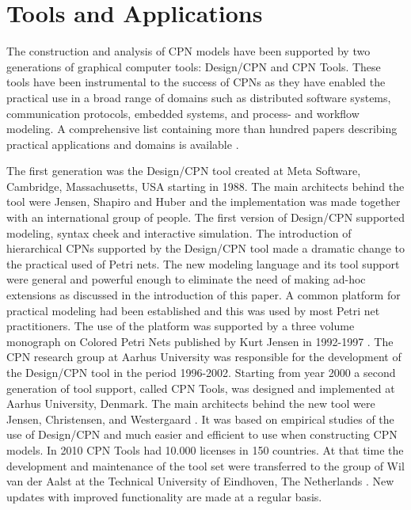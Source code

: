 \section{Tools and Applications}

The construction and analysis of CPN models have been supported by two
generations of graphical computer tools: Design/CPN and CPN
Tools. These tools have been instrumental to the success of CPNs as
they have enabled the practical use in a broad range of domains such
as distributed software systems, communication protocols, embedded
systems, and process- and workflow modeling. A comprehensive list
containing more than hundred papers describing practical applications
and domains is available \cite{cpnuse}.

The first generation was the Design/CPN tool \cite{X} created at Meta
Software, Cambridge, Massachusetts, USA starting in 1988. The main
architects behind the tool were Jensen, Shapiro and Huber
\cite{jensen:cpnmanual} and the implementation was made together with
an international group of people. The first version of Design/CPN
supported modeling, syntax cheek and interactive simulation. The
introduction of hierarchical CPNs supported by the Design/CPN tool
made a dramatic change to the practical used of Petri nets. The new
modeling language and its tool support were general and powerful
enough to eliminate the need of making ad-hoc extensions as discussed
in the introduction of this paper. A common platform for practical
modeling had been established and this was used by most Petri net
practitioners. The use of the platform was supported by a three volume
monograph on Colored Petri Nets published by Kurt Jensen in 1992-1997
\cite{jensen:cpnvols}. The CPN research group at Aarhus University was
responsible for the development of the Design/CPN tool in the period
1996-2002. Starting from year 2000 a second generation of tool
support, called CPN Tools, was designed and implemented at Aarhus
University, Denmark. The main architects behind the new tool were
Jensen, Christensen, and Westergaard \cite{X}.  It was based on
empirical studies of the use of Design/CPN and much easier and
efficient to use when constructing CPN models. In 2010 CPN Tools had
10.000 licenses in 150 countries. At that time the development and
maintenance of the tool set were transferred to the group of Wil van
der Aalst at the Technical University of Eindhoven, The Netherlands
\cite{cpntoolsweb}. New updates with improved functionality are made
at a regular basis.

